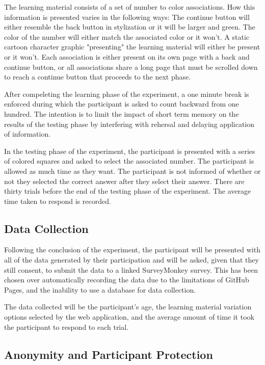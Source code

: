 \documentclass[12pt]{article}
\begin{document}
The learning material consists of a set of number to color associations. How this information is presented varies in the following ways: The continue button will either resemble the back button in stylization or it will be larger and green. The color of the number will either match the associated color or it won't. A static cartoon character graphic "presenting" the learning material will either be present or it won't. Each association is either present on its own page with a back and continue button, or all associations share a long page that must be scrolled down to reach a continue button that proceeds to the next phase.

After compeleting the learning phase of the experiment, a one minute break is enforced during which the participant is asked to count backward from one hundred. The intention is to limit the impact of short term memory on the results of the testing phase by interfering with rehersal and delaying application of information.\cite{cowan2008differences}

In the testing phase of the experiment, the participant is presented with a series of colored squares and asked to select the associated number. The participant is allowed as much time as they want. The participant is not informed of whether or not they selected the correct answer after they select their answer. There are thirty trials before the end of the testing phase of the experiment. The average time taken to respond is recorded.

\subsection{Data Collection}

Following the conclusion of the experiment, the participant will be presented with all of the data generated by their participation and will be asked, given that they still consent, to submit the data to a linked SurveyMonkey survey. This has been chosen over automatically recording the data due to the limitations of GitHub Pages, and the inability to use a database for data collection.

The data collected will be the participant's age, the learning material variation options selected by the web application, and the average amount of time it took the participant to respond to each trial.

\subsection{Anonymity and Participant Protection}
\end{document}
